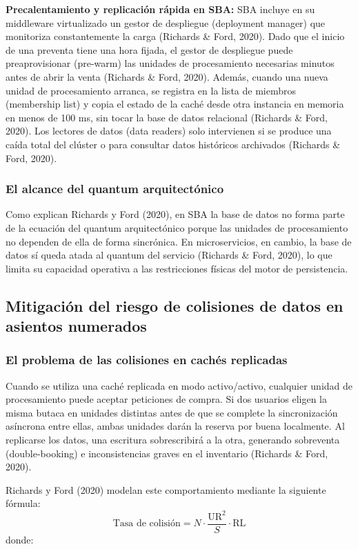 \documentclass[12pt, a4paper]{article}
\begin{document}
    \textbf{Precalentamiento y replicación rápida en SBA:} SBA incluye en su middleware virtualizado un gestor de despliegue (deployment manager) que monitoriza constantemente la carga (Richards \& Ford, 2020). Dado que el inicio de una preventa tiene una hora fijada, el gestor de despliegue puede preaprovisionar (pre-warm) las unidades de procesamiento necesarias minutos antes de abrir la venta (Richards \& Ford, 2020). Además, cuando una nueva unidad de procesamiento arranca, se registra en la lista de miembros (membership list) y copia el estado de la caché desde otra instancia en memoria en menos de 100 ms, sin tocar la base de datos relacional (Richards \& Ford, 2020). Los lectores de datos (data readers) solo intervienen si se produce una caída total del clúster o para consultar datos históricos archivados (Richards \& Ford, 2020).
    \subsubsection{El alcance del quantum arquitectónico}


    Como explican Richards y Ford (2020), en SBA la base de datos no forma parte de la ecuación del quantum arquitectónico porque las unidades de procesamiento no dependen de ella de forma sincrónica. En microservicios, en cambio, la base de datos sí queda atada al quantum del servicio (Richards \& Ford, 2020), lo que limita su capacidad operativa a las restricciones físicas del motor de persistencia.
    \subsection{Mitigación del riesgo de colisiones de datos en asientos numerados}
    \subsubsection{El problema de las colisiones en cachés replicadas}
    Cuando se utiliza una caché replicada en modo activo/activo, cualquier unidad de procesamiento puede aceptar peticiones de compra. Si dos usuarios eligen la misma butaca en unidades distintas antes de que se complete la sincronización asíncrona entre ellas, ambas unidades darán la reserva por buena localmente. Al replicarse los datos, una escritura sobrescribirá a la otra, generando sobreventa (double-booking) e inconsistencias graves en el inventario (Richards \& Ford, 2020).

    Richards y Ford (2020) modelan este comportamiento mediante la siguiente fórmula:
    \begin{equation}
    \text{Tasa de colisión} = N \cdot \frac{\text{UR}^{2}}{S} \cdot \text{RL}
    \end{equation}
    donde:
\end{document}

